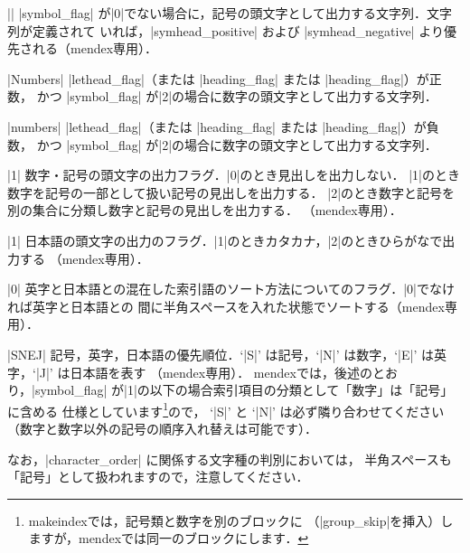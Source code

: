 \documentclass[a4paper,dvipdfmx]{jsarticle}
\newcommand{\SoftName}[1]{\textsf{#1}}
\begin{document}
\begin{description}[leftmargin=3.5cm]
\item[|symbol|] \ParamString*||
|symbol_flag| が|0|でない場合に，記号の頭文字として出力する文字列．文字列が定義されて
いれば，|symhead_positive| および |symhead_negative| より優先される（\SoftName{mendex}専用）．

\item[|numhead\string_positive|] \ParamString*|Numbers|
|lethead_flag|（または |heading_flag| または |heading_flag|）が正数，
かつ |symbol_flag| が|2|の場合に数字の頭文字として出力する文字列．

\item[|numhead\string_negative|] \ParamString*|numbers|
|lethead_flag|（または |heading_flag| または |heading_flag|）が負数，
かつ |symbol_flag| が|2|の場合に数字の頭文字として出力する文字列．

\item[|symbol\string_flag|] \ParamNum|1|
数字・記号の頭文字の出力フラグ．|0|のとき見出しを出力しない．
|1|のとき数字を記号の一部として扱い記号の見出しを出力する．
|2|のとき数字と記号を別の集合に分類し数字と記号の見出しを出力する．
（\SoftName{mendex}専用）．

\item[|letter\string_head|] \ParamNum|1|
日本語の頭文字の出力のフラグ．|1|のときカタカナ，|2|のときひらがなで出力する
（\SoftName{mendex}専用）．

\item[|priority|] \ParamNum|0|
英字と日本語との混在した索引語のソート方法についてのフラグ．|0|でなければ英字と日本語との
間に半角スペースを入れた状態でソートする（\SoftName{mendex}専用）．

\item[|character\string_order|] \ParamString*|SNEJ|
記号，英字，日本語の優先順位．`|S|' は記号，`|N|' は数字，`|E|' は英字，`|J|' は日本語を表す
（\SoftName{mendex}専用）．
\SoftName{mendex}では，後述のとおり，|symbol_flag| が|1|の以下の場合索引項目の分類として「数字」は「記号」に含める
仕様としています\footnote{\SoftName{makeindex}では，記号類と数字を別のブロックに
（|group\_skip|を挿入）しますが，\SoftName{mendex}では同一のブロックにします．}ので，
`|S|' と `|N|' は必ず隣り合わせてください（数字と数字以外の記号の順序入れ替えは可能です）．

なお，|character_order| に関係する文字種の判別においては，
半角スペースも「記号」として扱われますので，注意してください．
\end{description}
\end{document}
